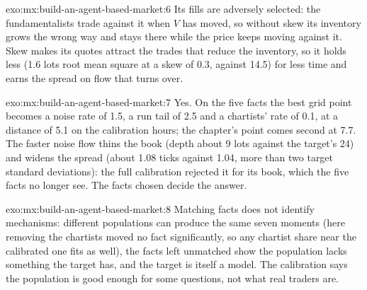 \begin{solution}{exo:mx:build-an-agent-based-market:6}
Its fills are adversely selected: the fundamentalists trade against it when $V$ has moved, so without skew its inventory grows the wrong way and
stays there while the price keeps moving against it. Skew makes its quotes attract the trades that reduce the inventory, so it holds less (1.6 lots root mean square at a skew of 0.3, against 14.5) for less time and earns the spread on flow that turns over.
\end{solution}

\begin{solution}{exo:mx:build-an-agent-based-market:7}
Yes. On the five facts the best grid point becomes a noise rate of 1.5, a run tail of 2.5 and a chartists' rate of 0.1, at a distance of 5.1 on the
calibration hours; the chapter's point comes second at 7.7. The faster noise flow thins the book (depth about 9 lots against the target's 24) and widens
the spread (about 1.08 ticks against 1.04, more than two target standard deviations): the full calibration rejected it for its book, which the five
facts no longer see. The facts chosen decide the answer.
\end{solution}

\begin{solution}{exo:mx:build-an-agent-based-market:8}
Matching facts does not identify mechanisms: different populations can produce the same seven moments (here removing the chartists moved no fact
significantly, so any chartist share near the calibrated one fits as well), the facts left unmatched show the population lacks something the target
has, and the target is itself a model. The calibration says the population is good enough for some questions, not what real traders are.
\end{solution}

